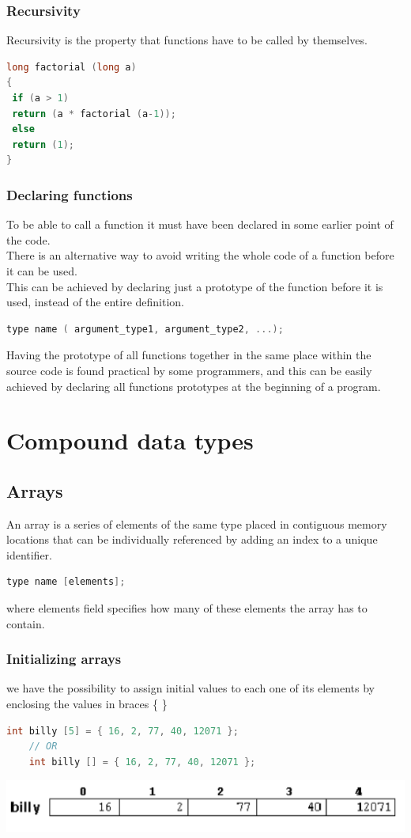 \documentclass[12pt,oneside]{book}
\begin{document}
\subsection{Recursivity}
Recursivity is the property that functions have to be called by themselves.
	\begin{lstlisting}[language=C++]
long factorial (long a) 
{ 
 if (a > 1) 
 return (a * factorial (a-1)); 
 else
 return (1); 
} 
    \end{lstlisting}
\subsection{Declaring functions}
To be able to call a function it must have been declared in some earlier point of the code.\\
There is an alternative way to avoid writing the whole code of a function before it can be used.\\
This can be achieved by declaring just a prototype of the function before it is used, instead of the entire definition.
	\begin{lstlisting}[language=C++]
    type name ( argument_type1, argument_type2, ...);
\end{lstlisting}
Having the prototype of all functions together in the same place within the source code is found practical by some
programmers, and this can be easily achieved by declaring all functions prototypes at the beginning of a program.
\chapter{Compound data types }
\section{Arrays}
An array is a series of elements of the same type placed in contiguous memory locations that can be individually referenced by adding an index to a unique identifier.
	\begin{lstlisting}[language=C++]
    type name [elements];
\end{lstlisting}
where  elements field specifies how many of these elements the array has to contain.
\subsection{Initializing arrays}
we have the possibility to assign initial values to each one of its elements by enclosing the values in braces \{ \}
\begin{lstlisting}[language=C++]
    int billy [5] = { 16, 2, 77, 40, 12071 };
    // OR
    int billy [] = { 16, 2, 77, 40, 12071 };
\end{lstlisting}
\begin{center}
	\includegraphics[width=0.5\linewidth]{../pic/3316/25.png}
\end{center}
\end{document}
